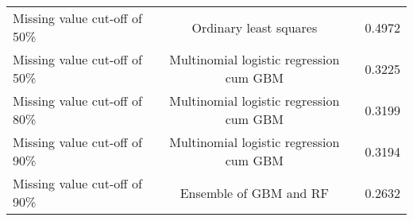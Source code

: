 \documentclass{article}\usepackage[]{graphicx}\usepackage[]{color}
\begin{document}
\begin{table}[ht]
\begin{tabular}{@{}|l|c|c|@{}}
Missing value cut-off of 50\% & Ordinary least squares & 0.4972 \\ 
Missing value cut-off of 50\% & Multinomial logistic regression cum GBM & 0.3225 \\                                                                                                                                                                                                                                                                                                                                                                                                                                                                                                                             Missing value cut-off of 80\% & Multinomial logistic regression cum GBM & 0.3199 \\
Missing value cut-off of 90\% & Multinomial logistic regression cum GBM & 0.3194 \\                                                                                                                                                                                                                                                                                                                                                                                                                                                                                                                                       
Missing value cut-off of 90\% & Ensemble of GBM and RF & 0.2632 \\ 

\end{tabular}
\end{table}
\end{document}
